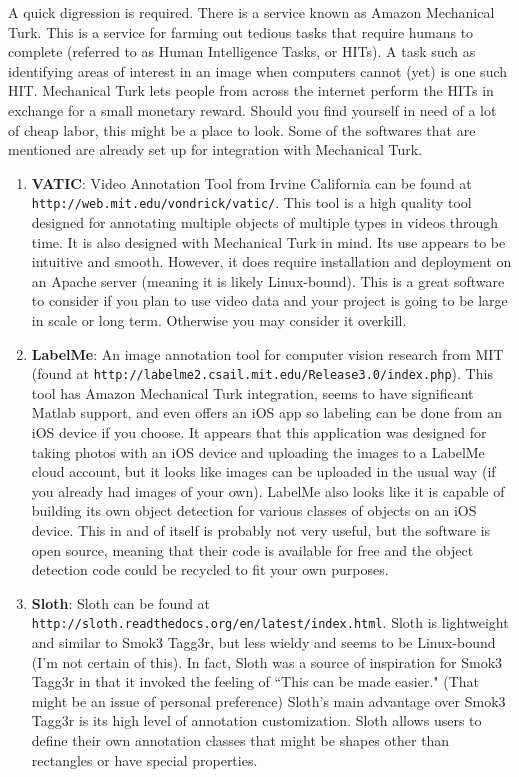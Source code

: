 \documentclass{article}
\begin{document}
A quick digression is required. There is a service known as Amazon Mechanical Turk. This is a service for farming out tedious tasks that require humans to complete (referred to as Human Intelligence Tasks, or HITs). A task such as identifying areas of interest in an image when computers cannot (yet) is one such HIT. Mechanical Turk lets people from across the internet perform the HITs in exchange for a small monetary reward. Should you find yourself in need of a lot of cheap labor, this might be a place to look. Some of the softwares that are mentioned are already set up for integration with Mechanical Turk.

\begin{enumerate}
  \item \textbf{VATIC}: Video Annotation Tool from Irvine California can be found at \texttt{http://web.mit.edu/vondrick/vatic/}. This tool is a high quality tool designed for annotating multiple objects of multiple types in videos through time. It is also designed with Mechanical Turk in mind. Its use appears to be intuitive and smooth. However, it does require installation and deployment on an Apache server (meaning it is likely Linux-bound). This is a great software to consider if you plan to use video data and your project is going to be large in scale or long term. Otherwise you may consider it overkill.

  \item \textbf{LabelMe}: An image annotation tool for computer vision research from MIT (found at \texttt{http://labelme2.csail.mit.edu/Release3.0/index.php}). This tool has Amazon Mechanical Turk integration, seems to have significant Matlab support, and even offers an iOS app so labeling can be done from an iOS device if you choose. It appears that this application was designed for taking photos with an iOS device and uploading the images to a LabelMe cloud account, but it looks like images can be uploaded in the usual way (if you already had images of your own). LabelMe also looks like it is capable of building its own object detection for various classes of objects on an iOS device. This in and of itself is probably not very useful, but the software is open source, meaning that their code is available for free and the object detection code could be recycled to fit your own purposes.

  \item \textbf{Sloth}: Sloth can be found at \texttt{http://sloth.readthedocs.org/en/latest/index.html}. Sloth is lightweight and similar to Smok3 Tagg3r, but less wieldy and seems to be Linux-bound (I'm not certain of this). In fact, Sloth was a source of inspiration for Smok3 Tagg3r in that it invoked the feeling of ``This can be made easier." (That might be an issue of personal preference) Sloth's main advantage over Smok3 Tagg3r is its high level of annotation customization. Sloth allows users to define their own annotation classes that might be shapes other than rectangles or have special properties.
\end{enumerate}
\end{document}
